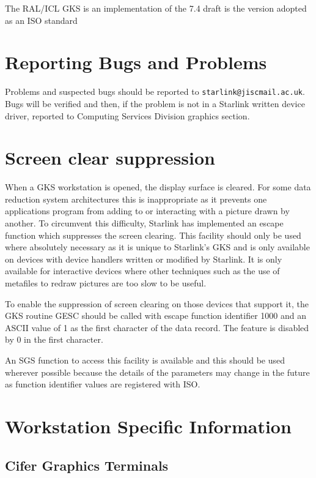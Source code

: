 \documentclass[11pt,nolof]{starlink}
\begin{document}
The RAL/ICL GKS is an implementation of the 7.4 draft
is the version adopted as an ISO standard

\section{Reporting Bugs and Problems}
Problems and suspected bugs should be reported to \texttt{starlink@jiscmail.ac.uk}.
Bugs will be verified and then, if the problem is not in a Starlink written
device driver, reported to Computing Services Division graphics section.

\section{Screen clear suppression}
When a GKS workstation is opened, the display surface is cleared.
For some data reduction system architectures this is inappropriate as it
prevents one applications program from adding to or interacting with a picture
drawn by another.
To circumvent this difficulty, Starlink has implemented an escape function which
suppresses the screen clearing.
This facility should only be used where absolutely necessary as it is unique to
Starlink's GKS and is only available on devices with device handlers written
or modified by Starlink.
It is only available for interactive devices where other techniques such as the
use of metafiles to redraw pictures are too slow to be useful.

To enable the suppression of screen clearing on those devices that support it,
the GKS routine GESC should be called with escape function identifier 1000 and
an ASCII value of 1 as the first character of the data record. The feature is
disabled by 0 in the first character.

An SGS function to access this facility is available and this should be used
wherever possible because the details of the parameters may change in the future
as function identifier values are registered with ISO.

\newpage\appendix
\section{Workstation Specific Information}\label{workstations}

\providecommand{\sect}[1]{\textbf{#1}}

\subsection{Cifer Graphics Terminals}
\label{cifgt}
\end{document}

